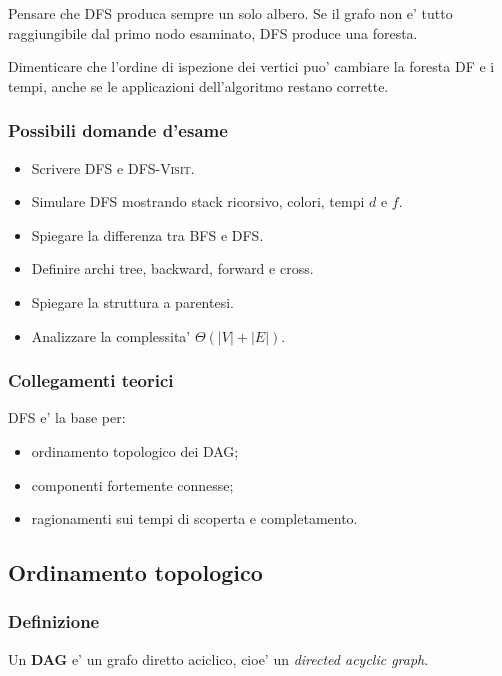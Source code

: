 \begin{hardnote}
Pensare che DFS produca sempre un solo albero. Se il grafo non e' tutto raggiungibile dal primo nodo esaminato, DFS produce una foresta.
\end{hardnote}

\begin{hardnote}
Dimenticare che l'ordine di ispezione dei vertici puo' cambiare la foresta DF e i tempi, anche se le applicazioni dell'algoritmo restano corrette.
\end{hardnote}

\subsubsection{Possibili domande d'esame}
\begin{itemize}
	\item Scrivere \textsc{DFS} e \textsc{DFS-Visit}.
	\item Simulare DFS mostrando stack ricorsivo, colori, tempi $d$ e $f$.
	\item Spiegare la differenza tra BFS e DFS.
	\item Definire archi tree, backward, forward e cross.
	\item Spiegare la struttura a parentesi.
	\item Analizzare la complessita' $\Theta(|V|+|E|)$.
\end{itemize}

\subsubsection{Collegamenti teorici}
DFS e' la base per:
\begin{itemize}
	\item ordinamento topologico dei DAG;
	\item componenti fortemente connesse;
	\item ragionamenti sui tempi di scoperta e completamento.
\end{itemize}

\subsection{Ordinamento topologico}

\subsubsection{Definizione}
Un \textbf{DAG} e' un grafo diretto aciclico, cioe' un \emph{directed acyclic graph}.

